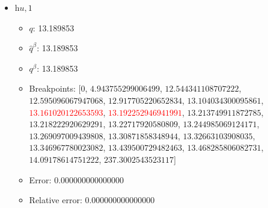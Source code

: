 \documentclass{article}%
\begin{document}
\begin{itemize}
\begin{itemize}
		\item Relative error: 0.000000000000000%
	\end{itemize}%
	\item $\textit{hu},1$%
	\begin{itemize}%
		\item $q$: 13.189853%
		\item $\hat{q}^\beta$: 13.189853%
		\item $q^\beta$: 13.189853%
		\item Breakpoints: $[$$0$, $4.943755299006499$, $12.544341108707222$, $12.595096067947068$, $12.917705220652834$, $13.104034300095861$, \textcolor{red}{$13.161020122653593$}, \textcolor{red}{$13.192252946941991$}, $13.213749911872785$, $13.218222920629291$, $13.22717920580809$, $13.244985069124171$, $13.269097009439808$, $13.30871858348944$, $13.32663103908035$, $13.346967780023082$, $13.439500729482463$, $13.468285806082731$, $14.09178614751222$, $237.3002543523117$$]$%
		\item Error: 0.000000000000000%
		\item Relative error: 0.000000000000000%
	\end{itemize}%
\end{itemize}%
\end{document}
